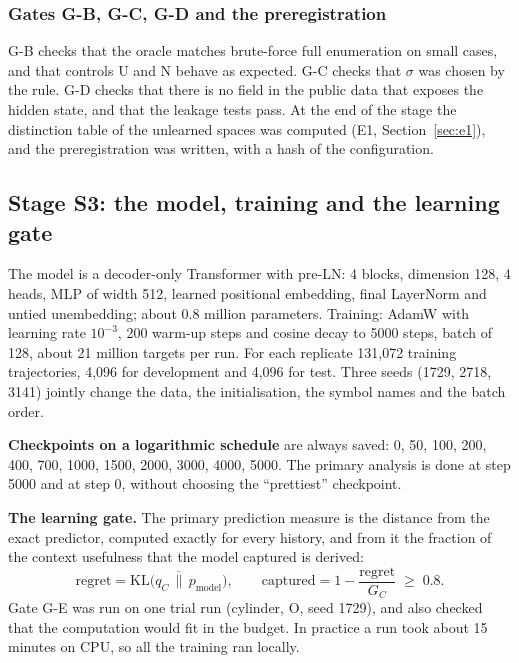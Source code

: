 \documentclass[12pt,a4paper]{article}
\newcommand{\en}[1]{\foreignlanguage{english}{#1}}   %
\newcommand{\GC}{G_{C}}
\newcommand{\KL}{\mathrm{KL}}
\begin{document}
\subsubsection{Gates \en{G-B}, \en{G-C}, \en{G-D} and the preregistration}
\en{G-B} checks that the oracle matches brute-force full enumeration on small cases, and that controls U and N behave as expected. \en{G-C} checks that $\sigma$ was chosen by the rule. \en{G-D} checks that there is no field in the public data that exposes the hidden state, and that the leakage tests pass. At the end of the stage the distinction table of the unlearned spaces was computed (\en{E1}, Section~\ref{sec:e1}), and the preregistration was written, with a \en{hash} of the configuration.

\subsection{Stage S3: the model, training and the learning gate}
The model is a \en{decoder-only} \en{Transformer} with \en{pre-LN}: 4 blocks, dimension 128, 4 heads, \en{MLP} of width 512, learned positional \en{embedding}, final \en{LayerNorm} and untied \en{unembedding}; about 0.8 million parameters. Training: \en{AdamW} with learning rate $10^{-3}$, 200 warm-up steps and \en{cosine} decay to 5000 steps, batch of 128, about 21 million targets per run. For each replicate 131,072 training trajectories, 4,096 for development and 4,096 for test. Three seeds (1729, 2718, 3141) jointly change the data, the initialisation, the symbol names and the batch order.

\textbf{Checkpoints on a logarithmic schedule} are always saved: 0, 50, 100, 200, 400, 700, 1000, 1500, 2000, 3000, 4000, 5000. The primary analysis is done at step 5000 and at step 0, without choosing the ``prettiest'' checkpoint.

\textbf{The learning gate.} The primary prediction measure is the distance from the exact predictor, computed exactly for every history, and from it the fraction of the context usefulness that the model captured is derived:
\begin{equation}
\mathrm{regret}=\overline{\KL\big(q_C\,\|\,p_{\mathrm{model}}\big)},\qquad
\mathrm{captured}=1-\frac{\mathrm{regret}}{\GC}\;\ge\;0.8 .
\end{equation}
Gate \en{G-E} was run on one trial run (cylinder, O, seed 1729), and also checked that the computation would fit in the budget. In practice a run took about 15 minutes on CPU, so all the training ran locally.
\end{document}
